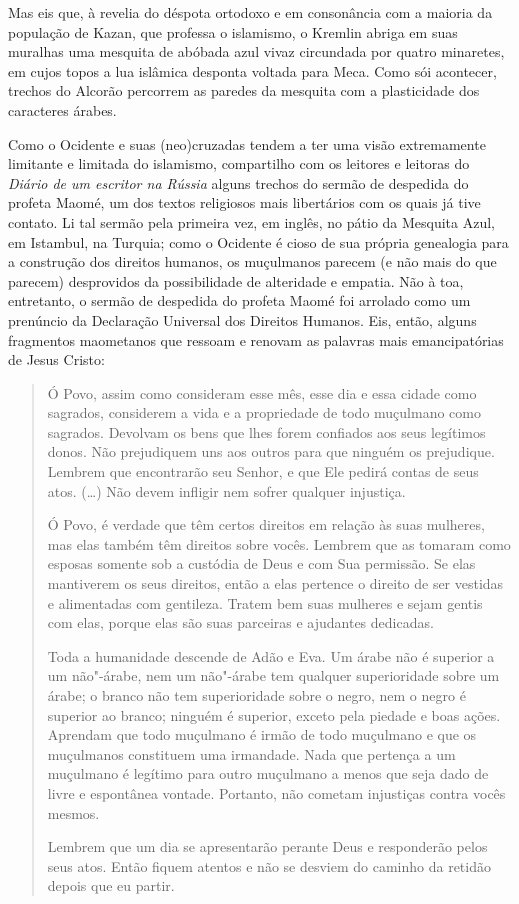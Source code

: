 Mas eis que, à revelia do déspota ortodoxo e em consonância com a
maioria da população de Kazan, que professa o islamismo, o Kremlin
abriga em suas muralhas uma mesquita de abóbada azul vivaz circundada
por quatro minaretes, em cujos topos a lua islâmica desponta voltada
para Meca. Como sói acontecer, trechos do Alcorão percorrem as paredes
da mesquita com a plasticidade dos caracteres árabes.

Como o Ocidente e suas (neo)cruzadas tendem a ter uma visão extremamente
limitante e limitada do islamismo, compartilho com os leitores e
leitoras do \emph{Diário de um escritor na Rússia} alguns trechos do
sermão de despedida do profeta Maomé, um dos textos religiosos mais
libertários com os quais já tive contato. Li tal sermão pela primeira
vez, em inglês, no pátio da Mesquita Azul, em Istambul, na Turquia; como
o Ocidente é cioso de sua própria genealogia para a construção dos
direitos humanos, os muçulmanos parecem (e não mais do que parecem)
desprovidos da possibilidade de alteridade e empatia. Não à toa,
entretanto, o sermão de despedida do profeta Maomé foi arrolado como um
prenúncio da Declaração Universal dos Direitos Humanos. Eis, então,
alguns fragmentos maometanos que ressoam e renovam as palavras mais
emancipatórias de Jesus Cristo:

\begin{quote}
Ó Povo, assim como consideram esse mês, esse dia e essa cidade como
sagrados, considerem a vida e a propriedade de todo muçulmano como
sagrados. Devolvam os bens que lhes forem confiados aos seus legítimos
donos. Não prejudiquem uns aos outros para que ninguém os prejudique.
Lembrem que encontrarão seu Senhor, e que Ele pedirá contas de seus
atos. (\ldots{}) Não devem infligir nem sofrer qualquer injustiça.

Ó Povo, é verdade que têm certos direitos em relação às suas mulheres,
mas elas também têm direitos sobre vocês. Lembrem que as tomaram como
esposas somente sob a custódia de Deus e com Sua permissão. Se elas
mantiverem os seus direitos, então a elas pertence o direito de ser
vestidas e alimentadas com gentileza. Tratem bem suas mulheres e sejam
gentis com elas, porque elas são suas parceiras e ajudantes dedicadas.

Toda a humanidade descende de Adão e Eva. Um árabe não é superior a um
não"-árabe, nem um não"-árabe tem qualquer superioridade sobre um árabe; o
branco não tem superioridade sobre o negro, nem o negro é superior ao
branco; ninguém é superior, exceto pela piedade e boas ações. Aprendam
que todo muçulmano é irmão de todo muçulmano e que os muçulmanos
constituem uma irmandade. Nada que pertença a um muçulmano é legítimo
para outro muçulmano a menos que seja dado de livre e espontânea
vontade. Portanto, não cometam injustiças contra vocês mesmos.

Lembrem que um dia se apresentarão perante Deus e responderão pelos seus
atos. Então fiquem atentos e não se desviem do caminho da retidão depois
que eu partir.
\end{quote}

